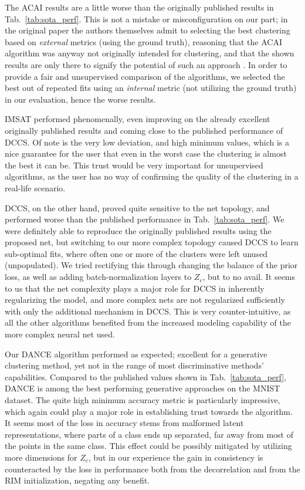 			The \ac{ACAI} results are a little worse than the originally published results in Tab.~\ref{tab:sota_perf}.
			This is not a mistake or misconfiguration on our part; in the original paper the authors themselves admit to selecting the best \kmeans{} clustering based on \textit{external} metrics (using the ground truth), reasoning that the \ac{ACAI} algorithm was anyway not originally intended for clustering, and that the shown results are only there to signify the potential of such an approach \cite{acai}.
			In order to provide a fair and unsupervised comparison of the algorithms, we selected the best out of repeated \kmeans{} fits using an \textit{internal} metric (not utilizing the ground truth) in our evaluation, hence the worse results.
			
			\ac{IMSAT} performed phenomenally, even improving on the already excellent originally published results and coming close to the published performance of \ac{DCCS}.
			Of note is the very low deviation, and high minimum values, which is a nice guarantee for the user that even in the worst case the clustering is almost the best it can be.
			This trust would be very important for unsupervised algorithms, as the user has no way of confirming the quality of the clustering in a real-life scenario.
			
			\ac{DCCS}, on the other hand, proved quite sensitive to the net topology, and performed worse than the published performance in Tab.~\ref{tab:sota_perf}.
			We were definitely able to reproduce the originally published results using the proposed net, but switching to our more complex topology caused \ac{DCCS} to learn sub-optimal fits, where often one or more of the clusters were left unused (unpopulated).
			We tried rectifying this through changing the balance of the prior loss, as well as adding batch-normalization layers to $Z_c$, but to no avail.
			It seems to us that the net complexity plays a major role for \ac{DCCS} in inherently regularizing the model, and more complex nets are not regularized sufficiently with only the additional mechanism in \ac{DCCS}.
			This is very counter-intuitive, as all the other algorithms benefited from the increased modeling capability of the more complex neural net used.
			
			Our \ac{DANCE} algorithm performed as expected; excellent for a generative clustering method, yet not in the range of most discriminative methods' capabilities.
			Compared to the published values shown in Tab.~\ref{tab:sota_perf}, \ac{DANCE} is among the best performing generative approaches on the MNIST dataset.
			The quite high minimum accuracy metric is particularly impressive, which again could play a major role in establishing trust towards the algorithm.
			It seems most of the loss in accuracy stems from malformed latent representations, where parts of a class ends up separated, far away from most of the points in the same class.
			This effect could be possibly mitigated by utilizing more dimensions for $Z_c$, but in our experience the gain in consistency is counteracted by the loss in performance both from the decorrelation and from the \ac{RIM} initialization, negating any benefit.
			
